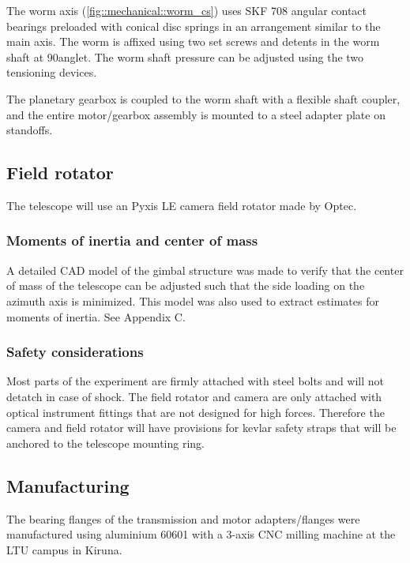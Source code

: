 The worm axis (\ref{fig::mechanical::worm_cs}) uses SKF 708 angular contact bearings preloaded with conical disc springs in an arrangement similar to the main axis. The worm is affixed using two set screws and detents in the worm shaft at 90\degree anglet. The worm shaft pressure can be adjusted using the two tensioning devices. 

The planetary gearbox is coupled to the worm shaft with a flexible shaft coupler, and the entire motor/gearbox assembly is mounted to a steel adapter plate on standoffs. 

\subsection{Field rotator}

The telescope will use an Pyxis LE camera field rotator made by Optec. 

\subsubsection{Moments of inertia and center of mass}

A detailed CAD model of the gimbal structure was made to verify that the center of mass of the telescope can be adjusted such that the side loading on the azimuth axis is minimized. This model was also used to extract estimates for moments of inertia. See Appendix C.

\subsubsection{Safety considerations}

Most parts of the experiment are firmly attached with steel bolts and will not detatch in case of shock. The field rotator and camera are only attached with optical instrument fittings that are not designed for high forces. Therefore the camera and field rotator will have provisions for kevlar safety straps that will be anchored to the telescope mounting ring. 

\subsection{Manufacturing}

The bearing flanges of the transmission and motor adapters/flanges were manufactured using aluminium 60601 with a 3-axis CNC milling machine at the LTU campus in Kiruna.

